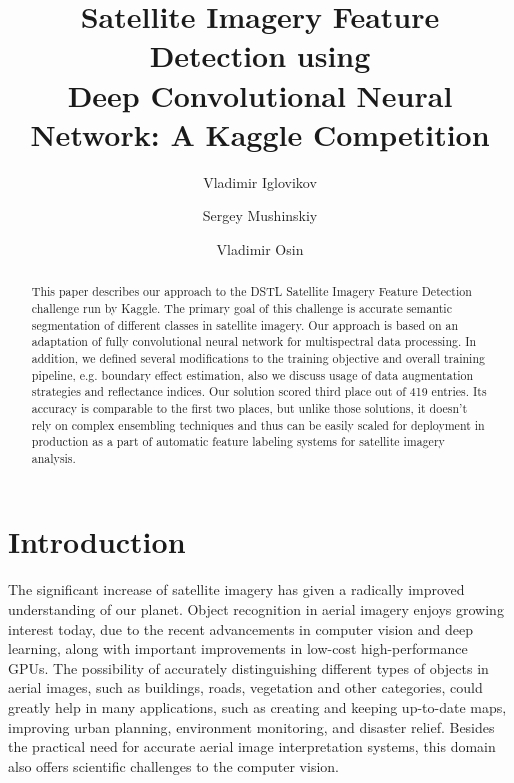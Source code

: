 \documentclass[10pt,twocolumn,letterpaper]{article}
\begin{document}
\title{Satellite Imagery Feature Detection using \\ Deep Convolutional Neural Network: A Kaggle Competition}

\author{Vladimir Iglovikov}

\author{Sergey Mushinskiy}

\author{Vladimir Osin}

\renewcommand\Authands{ and }

\maketitle

\begin{abstract}
This paper describes our approach to the DSTL Satellite Imagery Feature Detection challenge \cite{dstl_competition} run by Kaggle. The primary goal of this challenge is accurate semantic segmentation of different classes in satellite imagery. Our approach is based on an adaptation of fully convolutional neural network for multispectral data processing.  In addition, we defined several modifications to the training objective and overall training pipeline, e.g. boundary effect estimation, also we discuss usage of data augmentation strategies and reflectance indices. Our solution scored third place out of 419 entries. Its accuracy is comparable to the first two places, but unlike those solutions, it doesn't rely on complex ensembling techniques and thus can be easily scaled for deployment in production as a part of automatic feature labeling systems for satellite imagery analysis.
\end{abstract}

\section{Introduction}
The significant increase of satellite imagery has given a radically improved understanding of our planet. Object recognition in aerial imagery enjoys growing interest today, due to the recent advancements in computer vision and deep learning, along with important improvements in low-cost high-performance GPUs. The possibility of accurately distinguishing different types of objects in aerial images, such as buildings, roads, vegetation and other categories, could greatly help in many applications, such as creating and keeping up-to-date maps, improving urban planning, environment monitoring, and disaster relief. Besides the practical need for accurate aerial image interpretation systems, this domain also offers scientific challenges to the computer vision.
\end{document}
